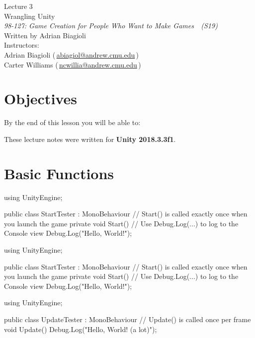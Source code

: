 \documentclass[11pt]{article}
\makeatletter
\newcommand{\lecturenum}{3}
\newcommand{\lecturename}{Wrangling Unity}
\newcommand{\authorname}{Adrian Biagioli}
\newcommand{\coursenum}{98-127}
\newcommand{\coursename}{Game Creation for People Who Want to Make Games}
\newcommand{\coursesem}{S19}
\newcommand{\instructors}{Adrian Biagioli (\,\href{mailto:abiagiol@andrew.cmu.edu}{abiagiol@andrew.cmu.edu}\,) \\ Carter Williams (\,\href{mailto:ncwillia@andrew.cmu.edu}{ncwillia@andrew.cmu.edu}\,)}
\def\StartLineAt#1{\lstset{firstnumber=#1}}
\makeatother
\begin{document}
\thispagestyle{plain}
{
    \vspace{1.5em}
    \begin{center}
    {
        \huge
        Lecture \lecturenum \\
        \vspace{0.5em}
        \lecturename
        \vspace{0.4em}
    } \\
    {
        \it
        \coursenum: \coursename\ \ (\coursesem)
    } \\
    \vspace{1.0em}
    Written by \authorname \\
    \vspace{0.7em}
    Instructors:\\ \instructors
    \end{center}
}

\section{Objectives}

By the end of this lesson you will be able to:

\noindent These lecture notes were written for {\bf Unity 2018.3.3f1}.

\section{Basic Functions}

\StartLineAt{1}
\begin{csharp}
using UnityEngine;

public class StartTester : MonoBehaviour
{
    // Start() is called exactly once when you launch the game
    private void Start()
    {
        // Use Debug.Log(...) to log to the Console view
        Debug.Log("Hello, World!");
    }
}
\end{csharp}

\StartLineAt{1}
\begin{csharp}
using UnityEngine;

public class StartTester : MonoBehaviour
{
    // Start() is called exactly once when you launch the game
    private void Start()
    {
        // Use Debug.Log(...) to log to the Console view
        Debug.Log("Hello, World!");
    }
}
\end{csharp}

\StartLineAt{1}
\begin{csharp}
using UnityEngine;

public class UpdateTester : MonoBehaviour
{
    // Update() is called once per frame
    void Update()
    {
        Debug.Log("Hello, World! (a lot)");
    }
}
\end{csharp}
\end{document}
